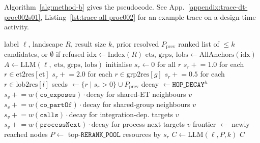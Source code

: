 Algorithm~\ref{alg:method-b} gives the pseudocode. See App.~\ref{appendix:trace-dt-proc002s01}, Listing~\ref{lst:trace-all-proc002} for an example trace on a design-time activity.



\begin{algorithm}[!t]\small
  \caption{Graph Walk --- graph-walk traversal (\texttt{src/methods/method\_c.py})}
  \label{alg:method-c}
  \begin{algorithmic}[1]
  \REQUIRE label $\ell$, landscape $R$, result size $k$, prior resolved $P_{\mathrm{prev}}$
  \ENSURE ranked list of $\le k$ candidates, or $\emptyset$ if refused
  \STATE $\mathrm{idx} \leftarrow \mathrm{Index}(R)$ 
  \STATE $\text{ets, grps, lobs} \leftarrow \mathrm{AllAnchors}(\mathrm{idx})$
  \STATE $A \leftarrow \mathrm{LLM}(\ell,\;\text{ets, grps, lobs})$ 
  \STATE initialise $s_r \leftarrow 0$ for all $r$
    \STATE $s_r \mathrel{+}= 1.0$ for each $r \in \mathrm{et2res}[\text{et}]$ 
  \ENDFOR
    \STATE $s_r \mathrel{+}= 2.0$ for each $r \in \mathrm{grp2res}[g]$ 
  \ENDFOR
    \STATE $s_r \mathrel{+}= 0.5$ for each $r \in \mathrm{lob2res}[l]$ 
  \ENDFOR
  \STATE seeds $\leftarrow \{r \mid s_r > 0\} \cup P_{\mathrm{prev}}$ 
    \STATE decay $\leftarrow \texttt{HOP\_DECAY}^h$
      \STATE $s_v \mathrel{+}= w(\texttt{co\_exposes}) \cdot \text{decay}$ for shared-ET neighbours $v$
      \STATE $s_v \mathrel{+}= w(\texttt{co\_partOf}) \cdot \text{decay}$ for shared-group neighbours $v$
      \STATE $s_v \mathrel{+}= w(\texttt{calls}) \cdot \text{decay}$ for integration-dep. targets $v$
      \STATE $s_v \mathrel{+}= w(\texttt{processNext}) \cdot \text{decay}$ for process-next targets $v$
    \ENDFOR
    \STATE frontier $\leftarrow$ newly reached nodes
  \ENDFOR
  \STATE $P \leftarrow$ top-$\texttt{RERANK\_POOL}$ resources by $s_r$
  \STATE $C \leftarrow \mathrm{LLM}(\ell, P, k)$ 
  \RETURN $C$
  \end{algorithmic}
  \end{algorithm}%

